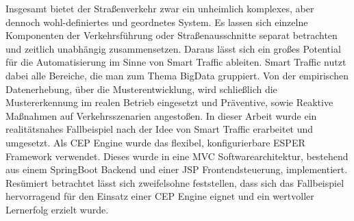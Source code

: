 Insgesamt bietet der Straßenverkehr zwar ein unheimlich komplexes, aber dennoch wohl-definiertes und geordnetes System.  Es lassen sich einzelne Komponenten der Verkehrsführung oder Straßenausschnitte  separat betrachten und zeitlich unabhängig zusammensetzen. Daraus lässt sich ein großes Potential für die Automatisierung im Sinne von Smart Traffic ableiten. Smart Traffic nutzt dabei alle Bereiche, die man zum Thema BigData gruppiert. Von der empirischen Datenerhebung, über die Musterentwicklung, wird schließlich die Mustererkennung im realen Betrieb eingesetzt und Präventive, sowie Reaktive Maßnahmen auf Verkehrsszenarien angestoßen.
In dieser Arbeit wurde ein realitätsnahes Fallbeispiel nach der Idee von Smart Traffic erarbeitet und umgesetzt. Als CEP Engine wurde das flexibel, konfigurierbare ESPER Framework verwendet. Dieses wurde in eine MVC  Softwarearchitektur, bestehend aus einem SpringBoot Backend und einer JSP  Frontendsteuerung, implementiert. Resümiert betrachtet lässt sich zweifelsohne feststellen, dass sich das Fallbeispiel hervorragend für den Einsatz einer CEP Engine eignet und ein wertvoller Lernerfolg erzielt wurde.



